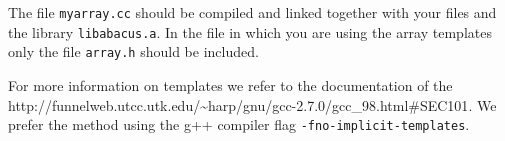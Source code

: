 \noindent
The file {\tt myarray.cc} should be compiled and linked together with
your files and the library {\tt libabacus.a}. In the file in which 
you are using the array templates only the file {\tt array.h} should
be included.

For more information on templates we refer to the documentation of 
the 
        {http://funnelweb.utcc.utk.edu/\~{}harp/gnu/gcc-2.7.0/gcc\_98.html\#SEC101}.
We prefer the method using the g++ compiler flag 
{\tt -fno-implicit-templates}.
